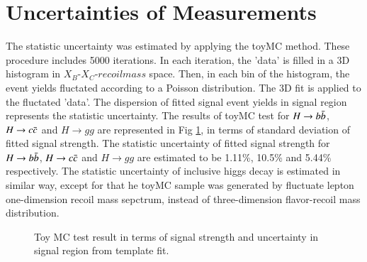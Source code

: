 \section{Uncertainties of Measurements}
The statistic uncertainty was estimated by applying the toyMC method. 
These procedure includes 5000 iterations. In each iteration, the 'data' is filled in a 3D histogram in $X_B$-$X_C$-$recoil mass$ space. 
Then, in each bin of the histogram, the event yields fluctated according to a Poisson distribution. 
The 3D fit is applied to the fluctated 'data'. The dispersion of fitted signal event yields in signal region represents the statistic uncertainty. 
The results of toyMC test for $H\rightarrow b\bar{b}$, $H\rightarrow c\bar{c}$ and $H\to gg$ are represented in Fig \ref{fig:toyMC}, in terms of standard deviation of fitted signal strength. The statistic 
uncertainty of fitted signal strength for $H\rightarrow b\bar{b}$, $H\rightarrow c\bar{c}$ and $H\to gg$ are estimated to be 1.11\%, 10.5\% and 5.44\% respectively.
The statistic uncertainty of inclusive higgs decay is estimated in similar way, 
except for that he toyMC sample was generated by fluctuate lepton one-dimension recoil mass sepctrum, instead of three-dimension flavor-recoil mass distribution.
\begin{figure}
\label{fig:toyMC}
\centering
{}
\caption{Toy MC test result in terms of signal strength and uncertainty in signal region from template fit.}
\end{figure}

